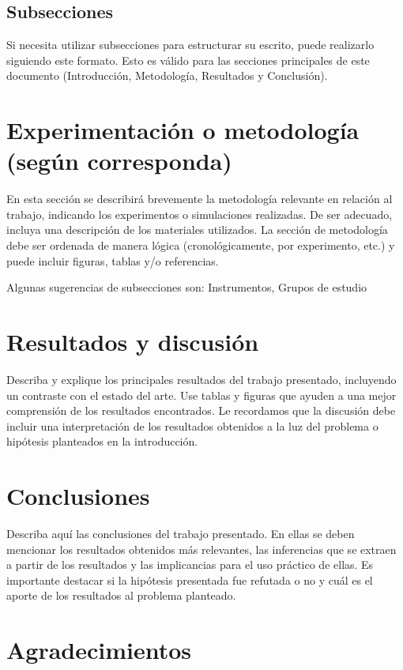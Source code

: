 \subsection{Subsecciones}

Si necesita utilizar subsecciones para estructurar su escrito, puede
realizarlo siguiendo este formato. Esto es válido para las secciones
principales de este documento (Introducción, Metodología, Resultados y
Conclusión).

\section{Experimentación o metodología (según corresponda)}

En esta sección se describirá brevemente la metodología relevante en
relación al trabajo, indicando los experimentos o simulaciones
realizadas. De ser adecuado, incluya una descripción de los materiales
utilizados. La sección de metodología debe ser ordenada de manera lógica
(cronológicamente, por experimento, etc.) y puede incluir figuras,
tablas y/o referencias.

Algunas sugerencias de subsecciones son: Instrumentos, Grupos de estudio

\section{Resultados y discusión}

Describa y explique los principales resultados del trabajo presentado,
incluyendo un contraste con el estado del arte. Use tablas y figuras que
ayuden a una mejor comprensión de los resultados encontrados. Le
recordamos que la discusión debe incluir una interpretación de los
resultados obtenidos a la luz del problema o hipótesis planteados en la
introducción.

\section{Conclusiones}

Describa aquí las conclusiones del trabajo presentado. En ellas se deben
mencionar los resultados obtenidos más relevantes, las inferencias que
se extraen a partir de los resultados y las implicancias para el uso
práctico de ellas. Es importante destacar si
la hipótesis presentada fue refutada o no y cuál es el aporte de los
resultados al problema planteado.

\section*{Agradecimientos}


